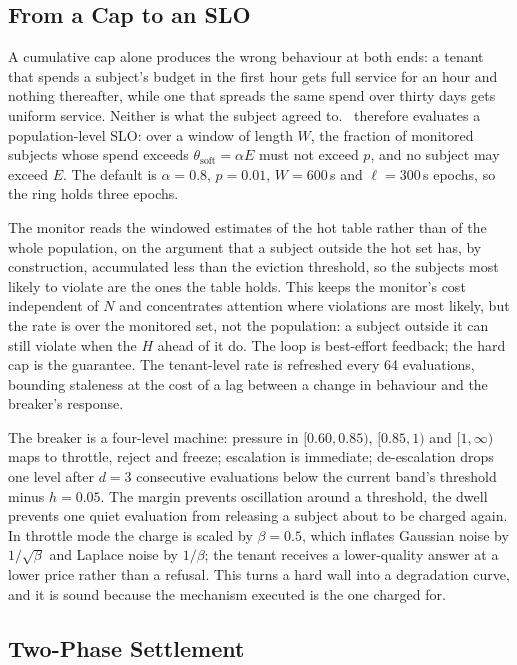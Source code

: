 \subsection{From a Cap to an SLO}
\label{sec:design-slo}

A cumulative cap alone produces the wrong behaviour at both ends: a tenant that
spends a subject's budget in the first hour gets full service for an hour and
nothing thereafter, while one that spreads the same spend over thirty days gets
uniform service. Neither is what the subject agreed to. \sys\ therefore evaluates a population-level SLO:
over a window of length $W$, the fraction of monitored subjects whose spend
exceeds $\theta_{\mathrm{soft}}=\alpha E$ must not exceed $p$, and no subject may
exceed $E$. The default is $\alpha=0.8$, $p=0.01$, $W=600$\,s and $\ell=300$\,s
epochs, so the ring holds three epochs.

The monitor reads the windowed estimates of the hot table rather than of the whole
population, on the argument that a subject outside the hot set has, by construction,
accumulated less than the eviction threshold, so the subjects most likely to
violate are the ones the table holds. This keeps the monitor's cost independent of $N$ and
concentrates attention where violations are most likely, but the rate is over the
monitored set, not the population: a subject outside it can still violate when the
$H$ ahead of it do. The loop is best-effort feedback; the hard cap is the guarantee. The
tenant-level rate is refreshed every 64 evaluations, bounding staleness at the cost
of a lag between a change in behaviour and the breaker's response.

The breaker is a four-level machine: pressure in $[0.60,0.85)$, $[0.85,1)$ and
$[1,\infty)$ maps to throttle, reject and freeze; escalation is immediate;
de-escalation drops one level after $d{=}3$ consecutive evaluations below the
current band's threshold minus $h{=}0.05$. The margin prevents oscillation around a
threshold, the dwell prevents one quiet evaluation from releasing a subject about to
be charged again. In throttle
mode the charge is scaled by $\beta=0.5$, which inflates Gaussian noise by
$1/\sqrt{\beta}$ and Laplace noise by $1/\beta$; the tenant receives a lower-quality
answer at a lower price rather than a refusal. This turns a hard wall into a degradation curve, and it is sound
because the mechanism executed is the one charged for.

\subsection{Two-Phase Settlement}
\label{sec:design-settle}

